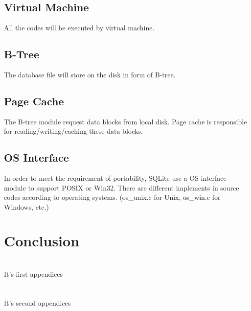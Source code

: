 \documentclass[journal]{IEEEtran}
\begin{document}
\subsection{Virtual Machine}
All the codes will be executed by virtual machine.

\subsection{B-Tree}
The database file will store on the disk in form of B-tree.

\subsection{Page Cache}
The B-tree module request data blocks from local disk. Page cache is responsible for reading/writing/caching these data blocks.

\subsection{OS Interface}
In order to meet the requirement of portability, SQLite use a OS interface module to support POSIX or Win32. There are different implements in source codes according to operating systems. (os\_unix.c for Unix, os\_win.c for Windows, etc.)

\section{Conclusion}

\appendices
\section{}
It's first appendices
        
\section{}
It's second appendices

    
\end{document}

